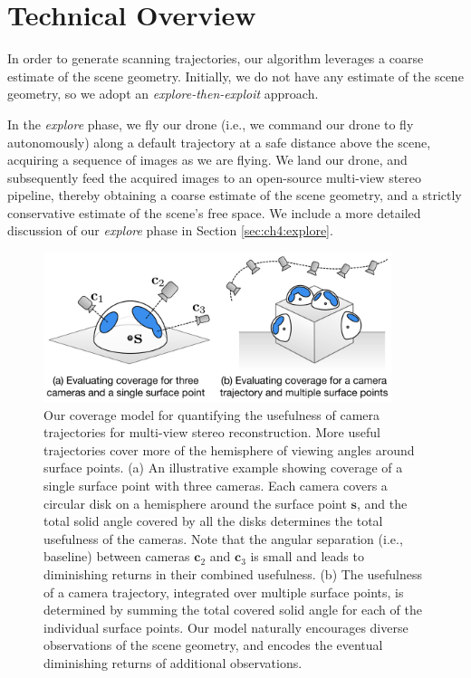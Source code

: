 \section{Technical Overview}
\label{sec:ch4:overview}

In order to generate scanning trajectories, our algorithm leverages a coarse estimate of the scene geometry.
Initially, we do not have any estimate of the scene geometry, so we adopt an \emph{explore-then-exploit} approach.

In the \emph{explore} phase, we fly our drone (i.e., we command our drone to fly autonomously) along a default trajectory at a safe distance above the scene, acquiring a sequence of images as we are flying.
We land our drone, and subsequently feed the acquired images to an open-source multi-view stereo pipeline, thereby obtaining a coarse estimate of the scene geometry, and  a strictly conservative estimate of the scene's free space.
We include a more detailed discussion of our \emph{explore} phase in Section \ref{sec:ch4:explore}.

\begin{figure}[t]
\begin{center}
\includegraphics[width=4.0in]{images/2017_iccv/coverage_model_horizontal.pdf}
\end{center}
\caption{
Our coverage model for quantifying the usefulness of camera trajectories for multi-view stereo reconstruction. More useful trajectories cover more of the hemisphere of viewing angles around surface points.
(a) An illustrative example showing coverage of a single surface point with three cameras. Each camera covers a circular disk on a hemisphere around the surface point $\mathbf{s}$, and the total solid angle covered by all the disks determines the total usefulness of the cameras.
Note that the angular separation (i.e., baseline) between cameras $\mathbf{c}_2$ and $\mathbf{c}_3$ is small and leads to diminishing returns in their combined usefulness.
(b) The usefulness of a camera trajectory, integrated over multiple surface points, is determined by summing the total covered solid angle for each of the individual surface points. Our model naturally encourages diverse observations of the scene geometry, and encodes the eventual diminishing returns of additional observations.
}
\label{fig:ch4:coverage_model}
\end{figure}

